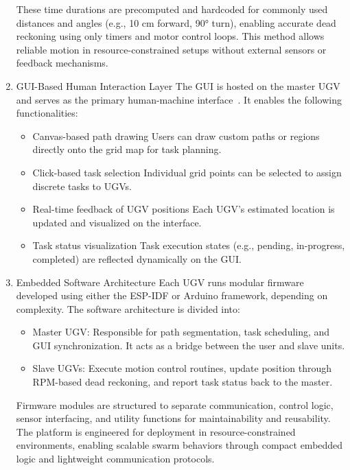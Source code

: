 \documentclass[conference]{IEEEtran}
\begin{document}
\begin{enumerate}
These time durations are precomputed and hardcoded for commonly used distances and angles (e.g., 10 cm forward, 90° turn), enabling accurate dead reckoning using only timers and motor control loops. This method allows reliable motion in resource-constrained setups without external sensors or feedback mechanisms.

\item {GUI-Based Human Interaction Layer}
\label{subsec:3.6}
The GUI is hosted on the master UGV and serves as the primary human-machine interface~\cite{randomnerd2024esp32}. It enables the following functionalities:
\begin{itemize}
    \item Canvas-based path drawing Users can draw custom paths or regions directly onto the grid map for task planning.
    \item Click-based task selection Individual grid points can be selected to assign discrete tasks to UGVs.
    \item Real-time feedback of UGV positions Each UGV's estimated location is updated and visualized on the interface.
    \item Task status visualization Task execution states (e.g., pending, in-progress, completed) are reflected dynamically on the GUI.
\end{itemize}

\item {Embedded Software Architecture}
Each UGV runs modular firmware developed using either the ESP-IDF or Arduino framework, depending on complexity. The software architecture is divided into:
\begin{itemize}
    \item {Master UGV:} Responsible for path segmentation, task scheduling, and GUI synchronization. It acts as a bridge between the user and slave units.
    \item {Slave UGVs:} Execute motion control routines, update position through RPM-based dead reckoning, and report task status back to the master.
\end{itemize}

Firmware modules are structured to separate communication, control logic, sensor interfacing, and utility functions for maintainability and reusability. The platform is engineered for deployment in resource-constrained environments, enabling scalable swarm behaviors through compact embedded logic and lightweight communication protocols.


\end{enumerate}
\end{document}
